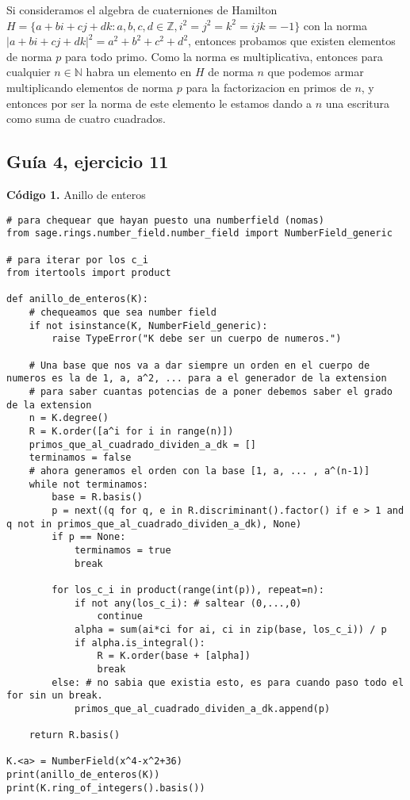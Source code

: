 \documentclass[12pt]{amsart}
\newcommand{\NN}{\mathbb{N}}
\newcommand{\ZZ}{\mathbb{Z}}
\theoremstyle{plain}
\begin{document}
Si consideramos el algebra de cuaterniones de Hamilton $H=\{ a+bi+cj+dk : a,b,c,d\in \ZZ, i^2=j^2=k^2=ijk=-1 \}$ con la norma $|a+bi+cj+dk|^2=a^2+b^2+c^2+d^2$, entonces probamos que existen elementos de norma $p$ para todo primo. Como la norma es multiplicativa, entonces para cualquier $n\in \NN$ habra un elemento en $H$ de norma $n$ que podemos armar multiplicando elementos de norma $p$ para la factorizacion en primos de $n$, y entonces por ser la norma de este elemento le estamos dando a $n$ una escritura como suma de cuatro cuadrados.


\subsection*{Guía 4, ejercicio 11}






\newpage

\vspace{1em}
\noindent\textbf{Código 1.} Anillo de enteros
\label{codigo1}

\lstset{
    language=Python,
    basicstyle=\ttfamily\small,
    frame=single,
    breaklines=true
}

\begin{lstlisting}
# para chequear que hayan puesto una numberfield (nomas)
from sage.rings.number_field.number_field import NumberField_generic

# para iterar por los c_i
from itertools import product

def anillo_de_enteros(K):
    # chequeamos que sea number field
    if not isinstance(K, NumberField_generic):
        raise TypeError("K debe ser un cuerpo de numeros.")

    # Una base que nos va a dar siempre un orden en el cuerpo de numeros es la de 1, a, a^2, ... para a el generador de la extension
    # para saber cuantas potencias de a poner debemos saber el grado de la extension
    n = K.degree()
    R = K.order([a^i for i in range(n)])
    primos_que_al_cuadrado_dividen_a_dk = []
    terminamos = false
    # ahora generamos el orden con la base [1, a, ... , a^(n-1)]
    while not terminamos:
        base = R.basis()
        p = next((q for q, e in R.discriminant().factor() if e > 1 and q not in primos_que_al_cuadrado_dividen_a_dk), None)
        if p == None:
            terminamos = true
            break

        for los_c_i in product(range(int(p)), repeat=n):
            if not any(los_c_i): # saltear (0,...,0)
                continue
            alpha = sum(ai*ci for ai, ci in zip(base, los_c_i)) / p
            if alpha.is_integral():
                R = K.order(base + [alpha])
                break
        else: # no sabia que existia esto, es para cuando paso todo el for sin un break.
            primos_que_al_cuadrado_dividen_a_dk.append(p)

    return R.basis()

K.<a> = NumberField(x^4-x^2+36)
print(anillo_de_enteros(K))
print(K.ring_of_integers().basis())

\end{lstlisting}
\end{document}
